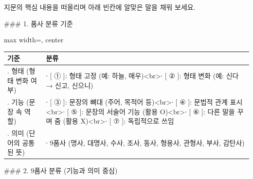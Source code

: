 \documentclass[fs9,seriesRus]{korfarm-base}
\begin{document}
\kfActivityBg \par{}지문의 핵심 내용을 떠올리며 아래 빈칸에 알맞은 말을 채워 보세요.

\#\#\# 1. 품사 분류 기준 

\par\medskip{}
\noindent\begin{adjustbox}{max width=\linewidth, center}
\renewcommand{\arraystretch}{1.45}
\begin{tabular}{|>{\raggedright\arraybackslash}p{}|>{\raggedright\arraybackslash}p{}|}
\hline
\rowcolor{kfPrimaryLight!50}\textbf{\color{kfPrimary} 기준} & \textbf{\color{kfPrimary} 분류} \\\hline
1. 형태 (형태 변화 여부) & ∙ [ ① ]: 형태 고정 (예: 하늘, 매우)<br>∙ [ ② ]: 형태 변화 (예: 신다 → 신고, 신으니) \\\hline
2. 기능 (문장 속 역할) & ∙ [ ③ ]: 문장의 뼈대 (주어, 목적어 등)<br>∙ [ ④ ]: 문법적 관계 표시<br>∙ [ ⑤ ]: 문장의 서술어 기능 (활용 O)<br>∙ [ ⑥ ]: 다른 말을 꾸며 줌 (활용 X)<br>∙ [ ⑦ ]: 독립적으로 쓰임 \\\hline
3. 의미 (단어의 공통된 뜻) & ∙ 9품사 (명사, 대명사, 수사, 조사, 동사, 형용사, 관형사, 부사, 감탄사) \\\hline
\end{tabular}
\end{adjustbox}\par\medskip



\#\#\# 2. 9품사 분류 (기능과 의미 중심) 
\end{document}
